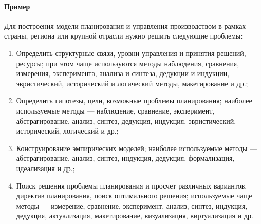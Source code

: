 \paragraph{Пример}
Для построения модели планирования и управления производством в рамках страны, региона или крупной отрасли нужно решить следующие проблемы:
\begin{enumerate}
    \item Определить структурные связи, уровни управления и принятия решений, ресурсы; при этом чаще используются методы наблюдения, сравнения, измерения, эксперимента, анализа и синтеза, дедукции и индукции, эвристический, исторический и логический методы, макетирование и др.;
    \item Определить гипотезы, цели, возможные проблемы планирования; наиболее используемые методы --- наблюдение, сравнение, эксперимент, абстрагирование, анализ, синтез, дедукция, индукция, эвристический, исторический, логический и др.;
    \item Конструирование эмпирических моделей; наиболее используемые методы --- абстрагирование, анализ, синтез, индукция, дедукция, формализация, идеализация и др.;
    \item Поиск решения проблемы планирования и просчет различных вариантов, директив планирования, поиск оптимального решения; используемые чаще методы --- измерение, сравнение, эксперимент, анализ, синтез, индукция, дедукция, актуализация, макетирование, визуализация, виртуализация и др.
\end{enumerate}
